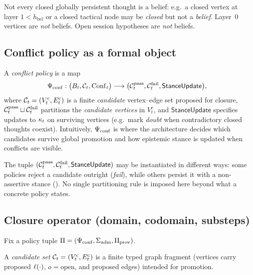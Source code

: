 \begin{remark}
Not every closed globally persistent thought is a belief: e.g.\ a closed vertex at layer $1<h_{\mathrm{bel}}$ or a closed tactical node may be \emph{closed} but not a \emph{belief}.
Layer~0 vertices are \emph{not} beliefs.
Open session hypotheses are \emph{not} beliefs.
\end{remark}

\subsection{Conflict policy as a formal object}

\begin{definition}
\label{def:conflict-policy}
A \emph{conflict policy} is a map
\[
  \Psi_{\mathrm{conf}} : \bigl(B_t,\mathcal{C}_t,\mathrm{Conf}_t\bigr) \longrightarrow \bigl(\mathcal{C}^{\mathrm{pass}}_t,\mathcal{C}^{\mathrm{fail}}_t,\mathsf{StanceUpdate}\bigr),
\]
where $\mathcal{C}_t=(V^{\mathrm{c}}_t,E^{\mathrm{c}}_t)$ is a finite \emph{candidate} vertex--edge set proposed for closure,
$\mathcal{C}^{\mathrm{pass}}_t\sqcup \mathcal{C}^{\mathrm{fail}}_t$ partitions the \emph{candidate vertices} in $V^{\mathrm{c}}_t$,
and $\mathsf{StanceUpdate}$ specifies updates to $\kappa_t$ on surviving vertices (e.g.\ mark \emph{doubt} when contradictory closed thoughts coexist).
Intuitively, $\Psi_{\mathrm{conf}}$ is where the architecture decides which candidates survive global promotion and how epistemic stance is updated when conflicts are visible.
\end{definition}

\begin{remark}
\label{rem:conflict-design-space}
The tuple $(\mathcal{C}^{\mathrm{pass}}_t,\mathcal{C}^{\mathrm{fail}}_t,\mathsf{StanceUpdate})$ may be instantiated in different ways: some policies reject a candidate outright (\emph{fail}), while others persist it with a non-assertive stance ().
No single partitioning rule is imposed here beyond what a concrete policy states.
\end{remark}

\subsection{Closure operator (domain, codomain, substeps)}
\label{sec:formal-closure}

Fix a policy tuple $\Pi=(\Psi_{\mathrm{conf}},\Sigma_{\mathrm{adm}},\Pi_{\mathrm{prov}})$.

\begin{definition}
\label{def:candidate}
A \emph{candidate set} $\mathcal{C}_t=(V^{\mathrm{c}}_t,E^{\mathrm{c}}_t)$ is a finite typed graph fragment (vertices carry proposed $\ell(\cdot)$, $o=\text{open}$, and proposed edges) intended for promotion.
\end{definition}

